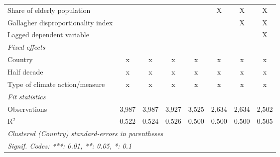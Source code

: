 \begin{table}[htbp]
\begin{tabular}{lccccccc}
      Share of elderly population                                       &                &               &              &             & X       & X       & X\\  
      Gallagher disproportionality index                                &                &               &              &             &         & X       & X\\  
      Lagged dependent variable                                         &                &               &              &             &         &         & X\\  
      \emph{Fixed effects}\\
      Country                                                           & x              & x             & x            & x           & x       & x       & x\\  
      Half decade                                                       & x              & x             & x            & x           & x       & x       & x\\  
      Type of climate action/measure                                    & x              & x             & x            & x           & x       & x       & x\\  
      \midrule \emph{Fit statistics}\\
      Observations                                                      & 3,987          & 3,987         & 3,927        & 3,525       & 2,634   & 2,634   & 2,502\\  
      R$^2$                                                             & 0.522          & 0.524         & 0.526        & 0.500       & 0.500   & 0.500   & 0.505\\  
      \midrule
      \multicolumn{8}{l}{\emph{Clustered (Country) standard-errors in parentheses}}\\
      \multicolumn{8}{l}{\emph{Signif. Codes: ***: 0.01, **: 0.05, *: 0.1}}\\
   \end{tabular}
\end{table}


